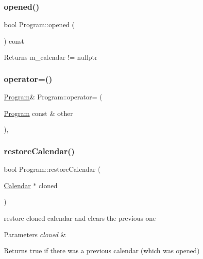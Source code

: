 \subsubsection{\texorpdfstring{opened()}{opened()}}
{\footnotesize\ttfamily bool Program\+::opened (\begin{DoxyParamCaption}{ }\end{DoxyParamCaption}) const}

\begin{DoxyReturn}{Returns}
m\+\_\+calendar != nullptr 
\end{DoxyReturn}
\mbox{\label{classProgram_af46704d2258695db8d0bc7d2b5edf48e}} 
\subsubsection{\texorpdfstring{operator=()}{operator=()}}
{\footnotesize\ttfamily \hyperlink{classProgram}{Program}\& Program\+::operator= (\begin{DoxyParamCaption}\item[{\hyperlink{classProgram}{Program} const \&}]{other }\end{DoxyParamCaption})\hspace{0.3cm}{\ttfamily [private]}, {\ttfamily [delete]}}

\mbox{\label{classProgram_a0c4c553237a075bc9ab5d4c6b80b4471}} 
\subsubsection{\texorpdfstring{restore\+Calendar()}{restoreCalendar()}}
{\footnotesize\ttfamily bool Program\+::restore\+Calendar (\begin{DoxyParamCaption}\item[{\hyperlink{classCalendar}{Calendar} $\ast$}]{cloned }\end{DoxyParamCaption})}

restore cloned calendar and clears the previous one 
\begin{DoxyParams}{Parameters}
{\em cloned} & \\
\hline
\end{DoxyParams}
\begin{DoxyReturn}{Returns}
true if there was a previous calendar (which was opened) 
\end{DoxyReturn}
\mbox{\label{classProgram_a9ab390cc3caa8cc7dee9704a273a6979}} 
